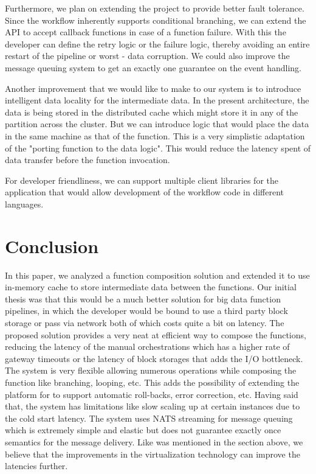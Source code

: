 \documentclass[12pt,titlepage]{article}
\begin{document}
Furthermore, we plan on extending the project to provide better fault tolerance.
Since the workflow inherently supports conditional branching, we can extend the
API to accept callback functions in case of a function failure. With this the
developer can define the retry logic or the failure logic, thereby avoiding an
entire restart of the pipeline or worst - data corruption. We could also improve
the message queuing system to get an exactly one guarantee on the event handling.

Another improvement that we would like to make to our system is to introduce
intelligent data locality for the intermediate data. In the present
architecture, the data is being stored in the distributed cache which might
store it in any of the partition across the cluster. But we can introduce logic
that would place the data in the same machine as that of the function. This is a
very simplistic adaptation of the "porting function to the data logic". This
would reduce the latency spent of data transfer before the function invocation.

For developer friendliness, we can support multiple client libraries for the
application that would allow development of the workflow code in different
languages.

\section{Conclusion}
\label{sec:org1a09202}
In this paper, we analyzed a function composition solution and extended it to
use in-memory cache to store intermediate data between the functions. Our
initial thesis was that this would be a much better solution for big data
function pipelines, in which the developer would be bound to use a third party
block storage or pass via network both of which costs quite a bit on latency.
The proposed solution provides a very neat at efficient way to compose the
functions, reducing the latency of the manual orchestrations which has a higher
rate of gateway timeouts or the latency of block storages that adds the I/O
bottleneck. The system is very flexible allowing numerous operations while
composing the function like branching, looping, etc. This adds the possibility
of extending the platform for to support automatic roll-backs, error correction,
etc. Having said that, the system has limitations like slow scaling up at
certain instances due to the cold start latency. The system uses NATS streaming
for message queuing which is extremely simple and elastic but does not guarantee
exactly once semantics for the message delivery. Like was mentioned in the
section above, we believe that the improvements in the virtualization technology
can improve the latencies further.
\end{document}
